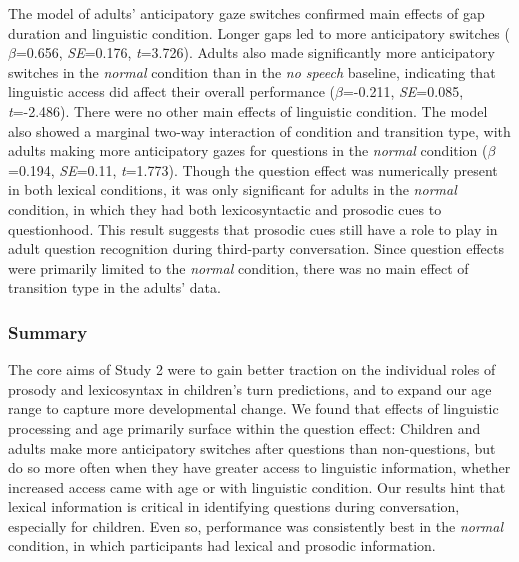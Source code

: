 \documentclass[authoryear, 12pt]{elsarticle}
\begin{document}
The model of adults' anticipatory gaze switches confirmed main effects of gap duration and linguistic condition. Longer gaps led to more anticipatory switches (\textit{$\beta$}=0.656, \textit{SE}=0.176, \textit{t}=3.726). Adults also made significantly more anticipatory switches in the \textit{normal} condition than in the \textit{no speech} baseline, indicating that linguistic access did affect their overall performance (\textit{$\beta$}=-0.211, \textit{SE}=0.085, \textit{t}=-2.486). There were no other main effects of linguistic condition. The model also showed a marginal two-way interaction of condition and transition type, with adults making more anticipatory gazes for questions in the \textit{normal} condition (\textit{$\beta$}=0.194, \textit{SE}=0.11, \textit{t}=1.773). Though the question effect was numerically present in both lexical conditions, it was only significant for adults in the \textit{normal} condition, in which they had both lexicosyntactic and prosodic cues to questionhood. This result suggests that prosodic cues still have a role to play in adult question recognition during third-party conversation. Since question effects were primarily limited to the \textit{normal} condition, there was no main effect of transition type in the adults' data.

\subsubsection{Summary}

The core aims of Study 2 were to gain better traction on the individual roles of prosody and lexicosyntax in children's turn predictions, and to expand our age range to capture more developmental change. We found that effects of linguistic processing and age primarily surface within the question effect: Children and adults make more anticipatory switches after questions than non-questions, but do so more often when they have greater access to linguistic information, whether increased access came with age or with linguistic condition. Our results hint that lexical information is critical in identifying questions during conversation, especially for children. Even so, performance was consistently best in the \textit{normal} condition, in which participants had lexical and prosodic information.
\end{document}
